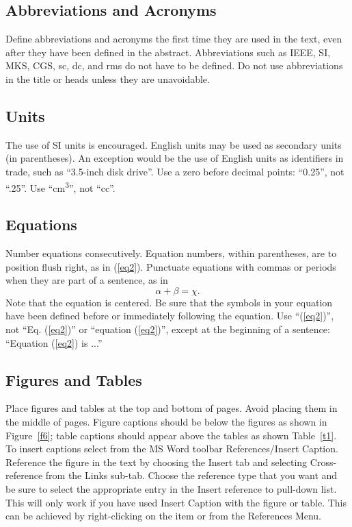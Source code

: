\documentclass{wrcecapstone}
\begin{document}
\subsection{Abbreviations and Acronyms}
Define abbreviations and acronyms the first time they are used in the text, even after they have been defined in the abstract. Abbreviations such as IEEE, SI, MKS, CGS, sc, dc, and rms do not have to be defined. Do not use abbreviations in the title or heads unless they are unavoidable.

\subsection{Units}
The use of SI units is encouraged. English units may be used as secondary units (in parentheses). An exception would be the use of English units as identifiers in trade, such as ``3.5-inch disk drive''. Use a zero before decimal points: ``0.25'', not ``.25''. Use ``\si{\centi\meter\cubed}'', not ``cc''. 

\subsection{Equations}
Number equations consecutively. Equation numbers, within parentheses, are to position flush right, as in (\ref{eq2}). Punctuate equations with commas or periods when they are part of a sentence, as in
\begin{equation}
\alpha + \beta = \chi.
\label{eq2}
\end{equation}
Note that the equation is centered. Be sure that the symbols in your equation have been defined before or immediately following the equation. Use ``(\ref{eq2})'', not ``Eq. (\ref{eq2})'' or ``equation (\ref{eq2})'', except at the beginning of a sentence: ``Equation (\ref{eq2}) is ...''

\subsection{Figures and Tables}
Place figures and tables at the top and bottom of pages. Avoid placing them in the middle of pages. Figure captions should be below the figures as shown in Figure~\ref{f6}; table captions should appear above the tables as shown Table~\ref{t1}. To insert captions select from the MS Word toolbar References/Insert Caption.  Reference the figure in the text by choosing the Insert tab and selecting Cross-reference from the Links sub-tab.  Choose the reference type that you want and be sure to select the appropriate entry in the Insert reference to pull-down list.  This will only work if you have used Insert Caption with the figure or table. This can be achieved by right-clicking on the item or from the References Menu.
\end{document}

